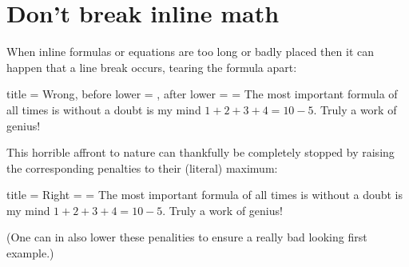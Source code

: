 \documentclass[a4paper, 10pt, headings=standardclasses, oneside, bibliography=totocnumbered]{scrbook}
\begin{document}
\section{Don’t break inline math}
\label{breaking inline math}

When inline formulas or equations are too long or badly placed then it can happen that a line break occurs, tearing the formula apart:
\begin{tcblisting}{title = {Wrong}, before lower = {}, after lower = {\binoppenalty = \maxdimen}}
The most important formula of all times is without a doubt is my mind $1 + 2 + 3 + 4 = 10 - 5$.
Truly a work of genius!
\end{tcblisting}
This horrible affront to nature can thankfully be completely stopped by raising the corresponding penalties to their (literal) maximum:
\begin{tcblisting}{title = {Right}}
\binoppenalty = \maxdimen
\relpenalty = \maxdimen
The most important formula of all times is without a doubt is my mind $1 + 2 + 3 + 4 = 10 - 5$.
Truly a work of genius!
\end{tcblisting}
(One can in also lower these penalities to ensure a really bad looking first example.)


% 
\end{document}
